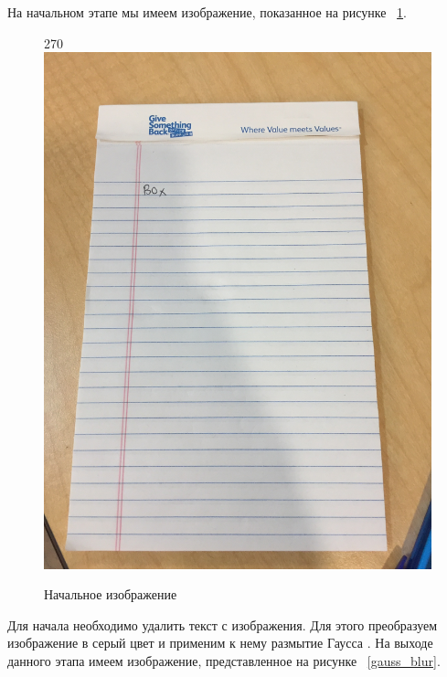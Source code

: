 На начальном этапе мы имеем изображение, показанное на рисунке ~\ref{input}.

\begin{figure}
    \begin{turn}{270}
        \includegraphics[scale=0.05]{img/perspective/input.JPG}
    \end{turn}
    \caption{Начальное изображение}
    \label{input}
\end{figure}

Для начала необходимо удалить текст с изображения. Для этого преобразуем изображение в серый цвет и применим к нему размытие Гаусса \cite{gauss_blur}. На выходе данного этапа имеем изображение, представленное на рисунке ~\ref{gauss_blur}.

